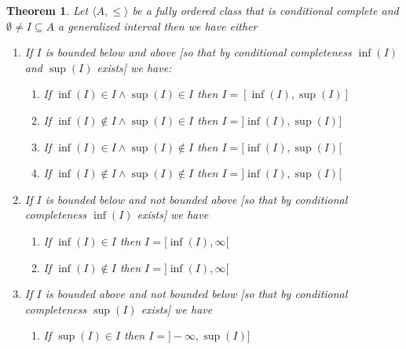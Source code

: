 \documentclass{book}
\newcommand{\nin}{\not\in}
\newtheorem{theorem}{Theorem}
\begin{document}
\begin{theorem}
  \label{interval and inf or sup}Let $\langle A, \leqslant \rangle$ be a fully
  ordered class that is conditional complete and $\emptyset \neq I \subseteq
  A$ a generalized interval then we have either
  \begin{enumerate}
    \item If $I$ is bounded below and above [so that by conditional
    completeness $\inf (I)$ and $\sup (I)$ exists] we have:
    \begin{enumerate}
      \item If $\inf (I) \in I \wedge \sup (I) \in I$ then $I = [\inf (I),
      \sup (I)]$
      
      \item If $\inf (I) \nin I \wedge \sup (I) \in I$ then $I =] \inf (I),
      \sup (I)]$
      
      \item If $\inf (I) \in I \wedge \sup (I) \nin I$ then $I = [\inf (I),
      \sup (I) [$
      
      \item If $\inf (I) \nin I \wedge \sup (I) \nin I$ then $I =] \inf (I),
      \sup (I) [$
    \end{enumerate}
    \item If $I$ is bounded below and not bounded above [so that by
    conditional completeness $\inf (I)$ exists] we have
    \begin{enumerate}
      \item If $\inf (I) \in I$ then $I = [\inf (I), \infty [$
      
      \item If $\inf (I) \nin I$ then $I =] \inf (I), \infty [$
    \end{enumerate}
    \item If $I$ is bounded above and not bounded below [so that by
    conditional completeness $\sup (I)$ exists] we have
    \begin{enumerate}
      \item If $\sup (I) \in I$ then $I =] - \infty, \sup (I)]$
      

\end{enumerate}
\end{enumerate}
\end{theorem}
\end{document}
